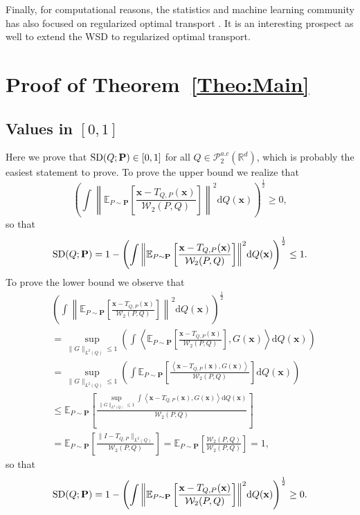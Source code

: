 \documentclass{imsart}
\numberwithin{equation}{section}
\def\R{\mathbb{R}}
\def\E{\mathbb{E}}
\def\x{\mathbf{x}}
\def\E{\mathbb E}
\def\x{\mathbf x}
\begin{document}
Finally, for computational reasons, the statistics and machine learning community has also focused on regularized optimal transport \citep{cuturi2013sinkhorn,peyre2019computational}. It is an interesting prospect as well to extend the WSD to regularized optimal transport.
  



\appendix 


\section{Proof of Theorem~\ref{Theo:Main}}

\subsection{Values in $[0,1]$}\label{subsection:liesIn01}   Here we prove that $\mathrm{SD}(Q; {\bf P})\in [0,1]$ for all $Q\in  \mathcal{P}^{a.c}_2(\R^d)$, which is probably the easiest statement to prove. To prove the upper bound we realize that 
$$ \left(\int{ \left\|\E_{P\sim \mathbf{P}}\left[  \frac{\x-T_{Q,P}(\x) }{\mathcal{W}_2(P,Q)}\right]\right\|^2} \mathrm{d} Q(\x)\right)^{\frac{1}{2}} \geq 0,$$
so that 
$$ \mathrm{SD}(Q; {\bf P})=1-  \left(\int{ \left\|\E_{P\sim \mathbf{P}}\left[  \frac{\x-T_{Q,P}(\x) }{\mathcal{W}_2(P,Q)}\right]\right\|^2} \mathrm{d} Q(\x)\right)^{\frac{1}{2}} \leq 1 . $$
To prove the lower bound we observe that 
\begin{align*}
	& \left(\int{ \left\|\E_{P\sim \mathbf{P}}\left[  \frac{\x-T_{Q,P}(\x) }{\mathcal{W}_2(P,Q)}\right]\right\|^2} \mathrm{d} Q(\x)\right)^{\frac{1}{2}} \\
	&=\sup_{\|G\|_{L^2(Q)}\leq 1} \left(\int{ \left\langle \E_{P\sim \mathbf{P}}\left[  \frac{\x-T_{Q,P}(\x)  }{\mathcal{W}_2(P,Q)}\right],  G(\x)\right\rangle} \mathrm{d} Q(\x)\right) \\
	&= \sup_{\|G\|_{L^2(Q)}\leq 1} \left(\int{  \E_{P\sim \mathbf{P}}\left[  \frac{\left\langle\x-T_{Q,P}(\x),G(\x)\right\rangle  }{\mathcal{W}_2(P,Q)}\right] } \mathrm{d} Q(\x)\right) \\
	& \leq   \E_{P\sim \mathbf{P}}\left[  \frac{ \sup_{\|G\|_{L^2(Q)}\leq 1} \int{ \left\langle\x-T_{Q,P}(\x),G(\x)\right\rangle } \mathrm{d} Q(\x) }{\mathcal{W}_2(P,Q)}\right] 
	\\
	&=   \E_{P\sim \mathbf{P}}\left[  \frac{ \|I-T_{Q,P}\|_{L^2(Q)}}{\mathcal{W}_2(P,Q)}\right] =  \E_{P\sim \mathbf{P}}\left[  \frac{ \mathcal{W}_2(P,Q)}{\mathcal{W}_2(P,Q)}\right] =1,
\end{align*}
so that 
$$ \mathrm{SD}(Q; {\bf P})=1-  \left(\int{ \left\|\E_{P\sim \mathbf{P}}\left[  \frac{\x-T_{Q,P}(\x) }{\mathcal{W}_2(P,Q)}\right]\right\|^2} \mathrm{d} Q(\x)\right)^{\frac{1}{2}} \geq 0 . $$
\end{document}

